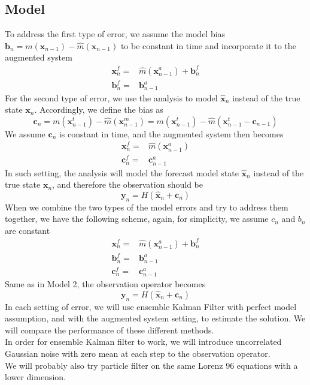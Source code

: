 \documentclass{report}
\begin{document}
\subsection*{Model}
To address the first type of error, we assume the model bias $\pmb{b}_{n}=m(\pmb{x}_{n-1})-\hat{m}(\pmb{x}_{n-1})$ to be constant in time and incorporate it to the augmented system 
\begin{align*}
\pmb{x}_{n}^{f}=&\hat{m}(\pmb{x}_{n-1}^{a})+\pmb{b}_{n}^{f}\\
\pmb{b}_{n}^{f}=&\pmb{b}_{n-1}^{a}
\end{align*}
For the second type of error, we use the analysis to model $\hat{\pmb{x}}_n$ instead of the true state $\pmb{x}_n$. Accordingly, we define the bias as
\begin{equation*}
\pmb{c}_{n}=m(\pmb{x}_{n-1}^{t})-\hat{m}(\pmb{x}_{n-1}^{m})=m(\pmb{x}_{n-1}^{t})-\hat{m}(\pmb{x}_{n-1}^{t}-\pmb{c}_{n-1})
\end{equation*}
We assume $\pmb{c}_n$ is constant in time, and the augmented system then becomes
\begin{align*}
\pmb{x}_{n}^{f}=&\hat{m}(\pmb{x}_{n-1}^{a})\\
\pmb{c}_{n}^{f}=&\pmb{c}_{n-1}^{a}
\end{align*}
In such setting, the analysis will model the forecast model state $\hat{\pmb{x}}_{n}$ instead of the true state $\pmb{x}_n$, and therefore the observation should be
\begin{equation*}
\pmb{y}_n=H(\hat{\pmb{x}}_n+\pmb{c}_n)
\end{equation*}
When we combine the two types of the model errors and try to address them together, we have the following scheme, again, for simplicity, we assume $c_n$ and $b_n$ are constant
\begin{align*}
\pmb{x}_{n}^{f}=&\hat{m}(\pmb{x}_{n-1}^{a})+\pmb{b}_{n}^{f}\\
\pmb{b}_{n}^{f}=&\pmb{b}_{n-1}^{a}\\
\pmb{c}_{n}^{f}=&\pmb{c}_{n-1}^{a}
\end{align*}
Same as in Model 2, the observation operator becomes
\begin{equation*}
\pmb{y}_n=H(\hat{\pmb{x}}_n+\pmb{c}_n)
\end{equation*}
In each setting of error, we will use ensemble Kalman Filter with perfect model assumption, and with the augmented system setting, to estimate the solution. We will compare the performance of these different methods.\\
In order for ensemble Kalman filter to work, we will introduce uncorrelated Gaussian noise with zero mean at each step to the observation operator.\\
We will probably also try particle filter on the same Lorenz 96 equations with a lower dimension.
\end{document}
